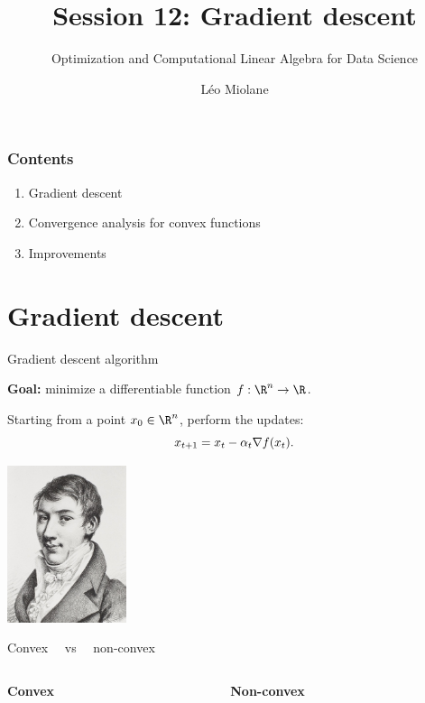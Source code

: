 \documentclass{beamer}
\title{Session 12: Gradient descent}
\subtitle{Optimization and Computational Linear Algebra for Data Science}
\author{Léo Miolane}
\date{}
\begin{document}
\setcounter{showProgressBar}{0}
\setcounter{showSlideNumbers}{0}

\frame{\titlepage}
\setcounter{framenumber}{0}
\setcounter{showSlideNumbers}{1}

\begin{frame}
	\frametitle{Contents}
	\begin{enumerate}
		\item Gradient descent
		\item Convergence analysis for convex functions
		\item Improvements
	\end{enumerate}
\end{frame}

\section{Gradient descent}

\begin{frame}[t]{Gradient descent algorithm}
	\grid

	\vspace{-0.2cm}
	\textbf{Goal:} minimize a differentiable function $f: \R^n \to \R$.
	\vspace{-0.3cm}
	\begin{exampleblock}{}
		Starting from a point $x_0 \in \R^n$, perform the updates:
		$$
		x_{t+1} = x_t - \alpha_t \nabla f(x_t).
	\vspace{-0.2cm}
		$$
	\end{exampleblock}
	\hspace*{-5mm}\includegraphics[width=3.5cm]{cauchy.jpg}

\end{frame}

\begin{frame}[t]{Convex  \ \ vs \ \ non-convex}
	\grid

	\begin{columns}
		\begin{column}{0.45\textwidth}
			\begin{center}
				\textbf{Convex}
			\end{center}
			\vspace{7cm}
	\end{column}
	\vrule
		\begin{column}{0.55\textwidth}
			\begin{center}
				\textbf{Non-convex}
			\end{center}
			\vspace{7cm}
	\end{column}
	\end{columns}

\end{frame}
\end{document}
